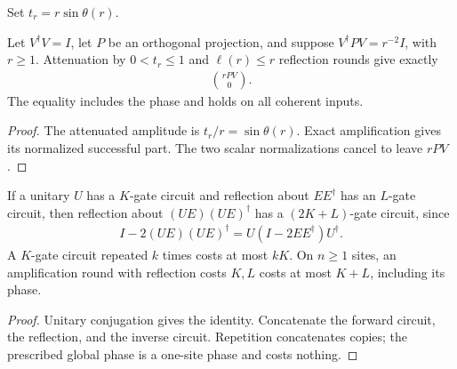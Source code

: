 \begin{definition}
    \label{def:mpu_exact_uniform_merging}
    \leanok
    Set $t_r=r\sin\theta(r)$.
\end{definition}

\begin{lemma}
    \label{thm:mpu_exact_uniform_merging}
    \leanok
    Let $V^\dagger V=I$, let $P$ be an orthogonal projection,
    and suppose $V^\dagger PV=r^{-2}I$, with $r\geq1$.
    Attenuation by $0<t_r\leq1$ and $\ell(r)\leq r$
    reflection rounds give exactly
    \begin{align}
        \binom{rPV}{0}.
    \end{align}
    The equality includes the phase and holds on all coherent inputs.
\end{lemma}
\begin{proof}\leanok
    The attenuated amplitude is $t_r/r=\sin\theta(r)$.
    Exact amplification gives its normalized successful part.
    The two scalar normalizations cancel to leave $rPV$.
\end{proof}

\begin{lemma}
    \label{thm:mpu_image_reflection_circuits}
    \leanok
    If a unitary $U$ has a $K$-gate circuit and reflection about
    $EE^\dagger$ has an $L$-gate circuit, then reflection about
    $(UE)(UE)^\dagger$ has a $(2K+L)$-gate circuit, since
    \begin{align}
        I-2(UE)(UE)^\dagger=U(I-2EE^\dagger)U^\dagger.
    \end{align}
    A $K$-gate circuit repeated $k$ times costs at most $kK$.
    On $n\geq1$ sites, an
    amplification round with reflection
    costs $K,L$ costs at most $K+L$, including its phase.
\end{lemma}
\begin{proof}\leanok
    Unitary conjugation gives the identity. Concatenate the forward
    circuit, the reflection, and the inverse circuit. Repetition
    concatenates copies; the prescribed global phase is a one-site phase and costs nothing.
\end{proof}


